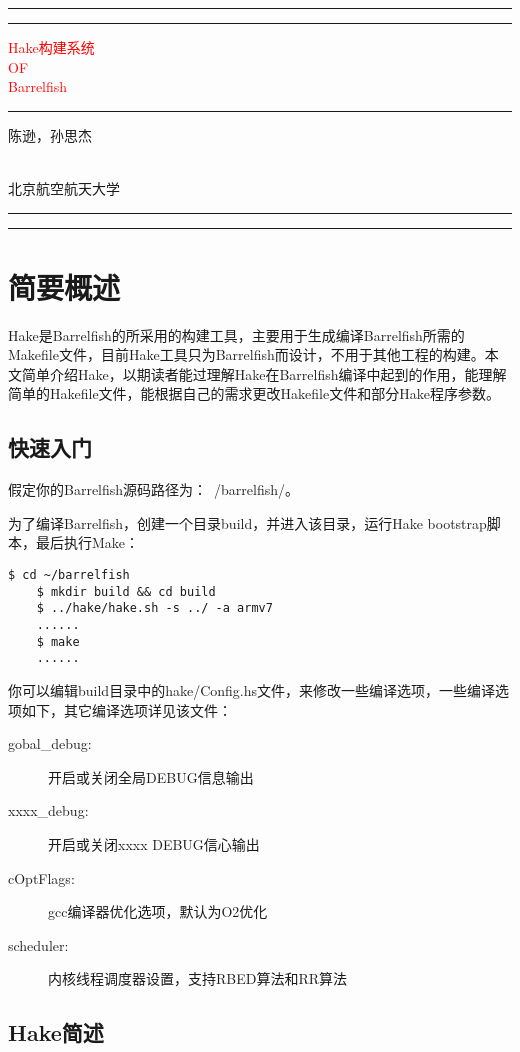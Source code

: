 \documentclass[a4paper, 12pt]{report}
\newcommand*{\plogo}{\fbox{$\mathcal{BUAALES}$}} %
\newcommand*{\titleAT}{\begingroup %
    \newlength{\drop} %
    \drop=0.1\textheight %
    
    \rule{\textwidth}{1pt}\par %
    \vspace{2pt}\vspace{-\baselineskip} %
    \rule{\textwidth}{0.4pt}\par %
    
    \vspace{\drop} %
    \centering %
    \textcolor{Red}{ %
        {\Huge Hake构建系统}\\[0.5\baselineskip] %
        {\Large OF}\\[0.75\baselineskip] %
        {\Huge Barrelfish}} %
    
    \vspace{0.25\drop} %
    \rule{0.3\textwidth}{0.4pt}\par %
    \vspace{\drop} %
    
    {\large \textsc{陈逊，孙思杰}}\par %
    
    \vfill %
    {\large \textcolor{Blue}{\plogo}}\\[0.5\baselineskip] %
    {\large \textsc{北京航空航天大学}}\par %
    
    \vspace*{\drop} %
    
    \rule{\textwidth}{0.4pt}\par %
    \vspace{2pt}\vspace{-\baselineskip} %
    \rule{\textwidth}{1pt}\par %
    
    \endgroup}
\begin{document}
    
    \pagestyle{empty} %
    \titleAT %
    
    \tableofcontents
    
    \chapter{简要概述}
	
    Hake是Barrelfish的所采用的构建工具，主要用于生成编译Barrelfish所需的Makefile文件，目前Hake工具只为Barrelfish而设计，不用于其他工程的构建。本文简单介绍Hake，以期读者能过理解Hake在Barrelfish编译中起到的作用，能理解简单的Hakefile文件，能根据自己的需求更改Hakefile文件和部分Hake程序参数。
    
	\section{快速入门}
    
    假定你的Barrelfish源码路径为：~/barrelfish/。
    
    为了编译Barrelfish，创建一个目录build，并进入该目录，运行Hake bootstrap脚本，最后执行Make：
    
    \begin{lstlisting}[language = Sh]
    $ cd ~/barrelfish
    $ mkdir build && cd build
    $ ../hake/hake.sh -s ../ -a armv7
    ......
    $ make
    ......
    \end{lstlisting}
    
    你可以编辑build目录中的hake/Config.hs文件，来修改一些编译选项，一些编译选项如下，其它编译选项详见该文件：
    \begin{description}
        \item[gobal\_debug:] 开启或关闭全局DEBUG信息输出
        \item[xxxx\_debug:] 开启或关闭xxxx DEBUG信心输出
        \item[cOptFlags:] gcc编译器优化选项，默认为O2优化
        \item[scheduler:] 内核线程调度器设置，支持RBED算法和RR算法
    \end{description}
	
	\section{Hake简述}
    
\end{document}
